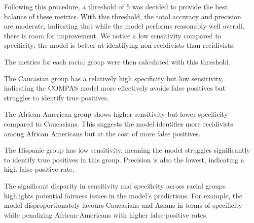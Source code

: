 Following this procedure, a threshold of 5 was decided to provide the best balance of these metrics. With this threshold, the total accuracy and precision are moderate, indicating that while the model performs reasonably well overall, there is room for improvement. We notice a low sensitivity compared to specificity; the model is better at identifying non-recidivists than recidivists.


The metrics for each racial group were then calculated with this threshold.


The Caucasian group has a relatively high specificity but low sensitivity, indicating the COMPAS model more effectively avoids false positives but struggles to identify true positives. 

The African-American group shows higher sensitivity but lower specificity compared to Caucasians. This suggests the model identifies more recidivists among African Americans but at the cost of more false positives.


The Hispanic group has low sensitivity, meaning the model struggles significantly to identify true positives in this group. Precision is also the lowest, indicating a high false-positive rate.


The significant disparity in sensitivity and specificity across racial groups highlights potential fairness issues in the model's predictions. For example, the model disproportionately favours Caucasians and Asians in terms of specificity while penalizing African-Americans with higher false-positive rates.

